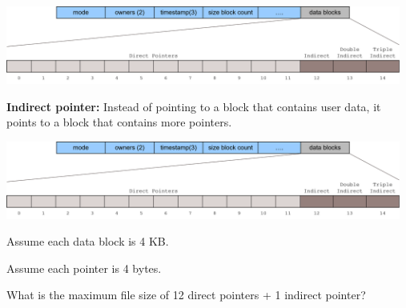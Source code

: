\begin{slide}


    \includegraphics[width=130mm]{inode-struct-2.png}
    \bigskip

    \textbf{Indirect pointer:} Instead of pointing to a block that contains user data, it points to a block that contains more pointers.
    \bigskip

\end{slide}

\begin{slide}


    \includegraphics[width=130mm]{inode-struct-2.png}
    \bigskip

    Assume each data block is 4 KB.

    Assume each pointer is 4 bytes.
    \bigskip

    What is the maximum file size of 12 direct pointers + 1 indirect pointer?

\end{slide}

\begin{slide}

\end{slide}

